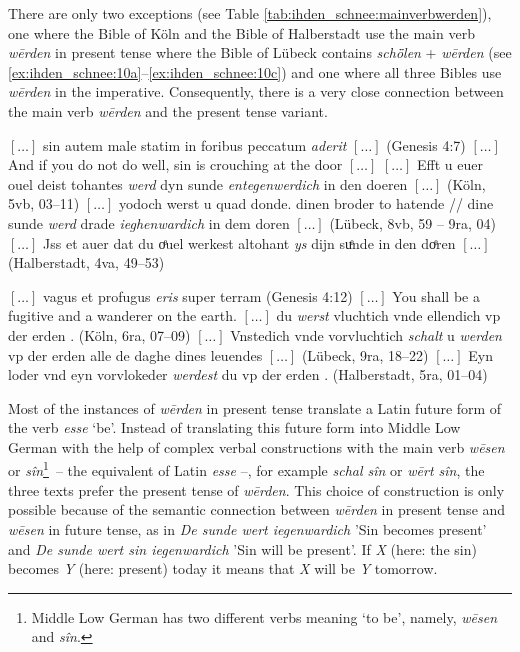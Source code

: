 \documentclass[output=paper,colorlinks,citecolor=brown]{langscibook}
\begin{document}
\largerpage[-1]

There are only two exceptions (see Table \ref{tab:ihden_schnee:mainverbwerden}), one where the Bible of Köln and the Bible of Halberstadt use the main verb \textit{wērden} in present tense where the Bible of Lübeck contains \textit{schȫlen} + \textit{wērden} (see \ref{ex:ihden_schnee:10a}--\ref{ex:ihden_schnee:10c}) and one where all three Bibles use \textit{wērden} in the imperative. Consequently, there is a very close connection between the main verb \textit{wērden} and the present tense variant.

\ea $[\ldots]$ sin autem male statim in foribus peccatum \textit{aderit} $[\ldots]$ (Genesis 4:7) \label{ex:ihden_schnee:9}
\exi{} $[\ldots]$ And if you do not do well, sin is crouching at the door $[\ldots]$
\ea $[\ldots]$ Efft u euer ouel deist tohantes \textit{werd} dyn sunde \textit{entegenwerdich} in den doeren $[\ldots]$ (Köln, 5vb, 03--11)\label{ex:ihden_schnee:9a}
\ex $[\ldots]$ yodoch werst u quad donde. dinen broder to hatende // dine sunde \textit{werd} drade \textit{ieghenwardich} in dem doren $[\ldots]$ (Lübeck, 8vb, 59 -- 9ra, 04)\label{ex:ihden_schnee:9b}
\ex $[\ldots]$ Jss et auer dat du oͤuel werkest altohant \textit{ys} dijn suͤnde in den doͤren $[\ldots]$ (Halberstadt, 4va, 49--53)\label{ex:ihden_schnee:9c}
\z
\z
{} %

\largerpage[2]

\ea $[\ldots]$ vagus et profugus \textit{eris} super terram (Genesis 4:12) \label{ex:ihden_schnee:10}
\exi{} $[\ldots]$ You shall be a fugitive and a wanderer on the earth.
\ea $[\ldots]$ du \textit{werst} vluchtich vnde ellendich vp der erden . (Köln, 6ra, 07--09)\label{ex:ihden_schnee:10a}
\ex $[\ldots]$ Vnstedich vnde vorvluchtich \textit{schalt} u \textit{werden} vp der erden alle de daghe dines leuendes $[\ldots]$ (Lübeck, 9ra, 18--22)\label{ex:ihden_schnee:10b}
\ex $[\ldots]$ Eyn loder vnd eyn vorvlokeder \textit{werdest} du vp der erden . (Halberstadt, 5ra, 01--04)\label{ex:ihden_schnee:10c}
\z
\z
{} %

Most of the instances of \textit{wērden} in present tense translate a Latin future form of the verb \textit{esse} `be'. Instead of translating this future form into Middle Low German with the help of complex verbal constructions with the main verb \textit{wēsen} or \textit{sîn}\footnote{Middle Low German has two different verbs meaning ‘to be’, namely, \textit{wēsen} and \textit{sîn}.}~-- the equivalent of Latin \textit{esse} --, for example \textit{schal sîn} or \textit{wērt sîn}, the three texts prefer the present tense of \textit{wērden}. This choice of construction is only possible because of the semantic connection between \textit{wērden} in present tense and \textit{wēsen} in future tense, as in \textit{De sunde wert iegenwardich} 'Sin becomes present' and \textit{De sunde wert sin iegenwardich} 'Sin will be present'. If \textit{X} (here: the sin) becomes \textit{Y} (here: present) today it means that \textit{X} will be \textit{Y} tomorrow.
\end{document}

